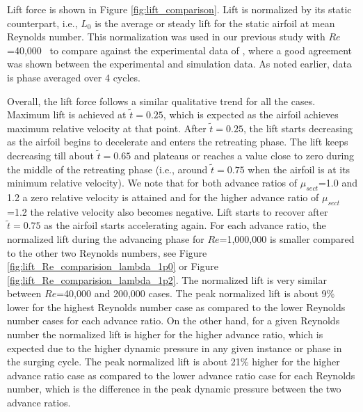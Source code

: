 Lift force is shown in Figure \ref{fig:lift_comparison}.
Lift is normalized by its static counterpart, i.e., $L_0$ is the average or steady lift for the static airfoil at mean Reynolds number.
This normalization was used in our previous study with $Re$=40,000~\cite{bib:kocher_scitech2017} to compare against the experimental data of \cite{bib:granlund2016}, where a good agreement was shown between the experimental and simulation data.
As noted earlier, data is phase averaged over 4 cycles.

Overall, the lift force follows a similar qualitative trend for all the cases.
Maximum lift is achieved at $\tilde{t}=0.25$, which is expected as the airfoil achieves maximum relative velocity at that point.
After $\tilde{t}=0.25$, the lift starts decreasing as the airfoil begins to decelerate and enters the retreating phase. 
The lift keeps decreasing till about $\tilde{t}=0.65$ and plateaus or reaches a value close to zero during the middle of the retreating phase (i.e., around $\tilde{t}=0.75$ when the airfoil is at its minimum relative velocity).
We note that for both advance ratios of $\mu_{sect}$=1.0 and 1.2 a zero relative velocity is attained and for the higher advance ratio of $\mu_{sect}$=1.2 the relative velocity also becomes negative.
Lift starts to recover after $\tilde{t}=0.75$ as the airfoil starts accelerating again.
For each advance ratio, the normalized lift during the advancing phase for $Re$=1,000,000 is smaller compared to the other two Reynolds numbers, see Figure \ref{fig:lift_Re_comparision_lambda_1p0} or Figure \ref{fig:lift_Re_comparision_lambda_1p2}.
The normalized lift is very similar between $Re$=40,000 and 200,000 cases.
The peak normalized lift is about 9\% lower for the highest Reynolds number case as compared to the lower Reynolds number cases for each advance ratio.
On the other hand, for a given Reynolds number the normalized lift is higher for the higher advance ratio, which is expected due to the higher dynamic pressure in any given instance or phase in the surging cycle.
The peak normalized lift is about 21\% higher for the higher advance ratio case as compared to the lower advance ratio case for each Reynolds number, which is the difference in the peak dynamic pressure between the two advance ratios.

